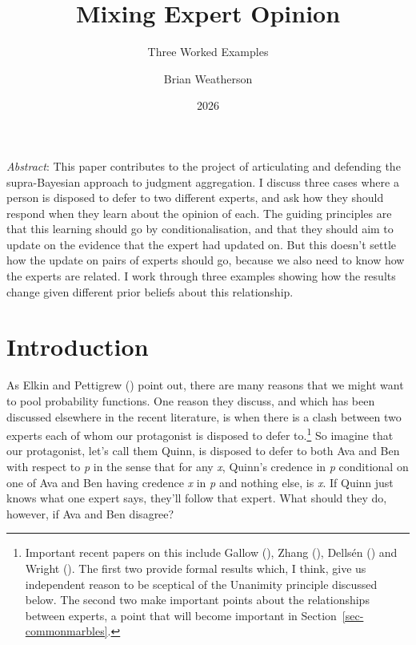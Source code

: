 \documentclass[
  11pt,
  letterpaper,
  DIV=11,
  numbers=noendperiod,
  twoside]{scrartcl}
\title{Mixing Expert Opinion}
\subtitle{Three Worked Examples}
\author{Brian Weatherson}
\date{2026}
\renewenvironment{abstract}
 {\vspace{-1.25cm}
 \quotation\small\noindent\emph{Abstract}:}
 {\endquotation}
\renewenvironment{abstract}
 {\quotation\small\noindent\emph{Abstract}:}
 {\endquotation\vspace{-0.02cm}}
\begin{document}
\maketitle
\begin{abstract}
This paper contributes to the project of articulating and defending the
supra-Bayesian approach to judgment aggregation. I discuss three cases
where a person is disposed to defer to two different experts, and ask
how they should respond when they learn about the opinion of each. The
guiding principles are that this learning should go by
conditionalisation, and that they should aim to update on the evidence
that the expert had updated on. But this doesn't settle how the update
on pairs of experts should go, because we also need to know how the
experts are related. I work through three examples showing how the
results change given different prior beliefs about this relationship.
\end{abstract}


\section{Introduction}\label{sec-intro}

As Elkin and Pettigrew () point
out, there are many reasons that we might want to pool probability
functions. One reason they discuss, and which has been discussed
elsewhere in the recent literature, is when there is a clash between two
experts each of whom our protagonist is disposed to defer to.\footnote{Important
  recent papers on this include Gallow
  (), Zhang
  (), Dellsén
  () and Wright
  (). The first two provide formal
  results which, I think, give us independent reason to be sceptical of
  the Unanimity principle discussed below. The second two make important
  points about the relationships between experts, a point that will
  become important in Section~\ref{sec-commonmarbles}.} So imagine that
our protagonist, let's call them Quinn, is disposed to defer to both Ava
and Ben with respect to \emph{p} in the sense that for any \emph{x},
Quinn's credence in \emph{p} conditional on one of Ava and Ben having
credence \emph{x} in \emph{p} and nothing else, is \emph{x}. If Quinn
just knows what one expert says, they'll follow that expert. What should
they do, however, if Ava and Ben disagree?
\end{document}
